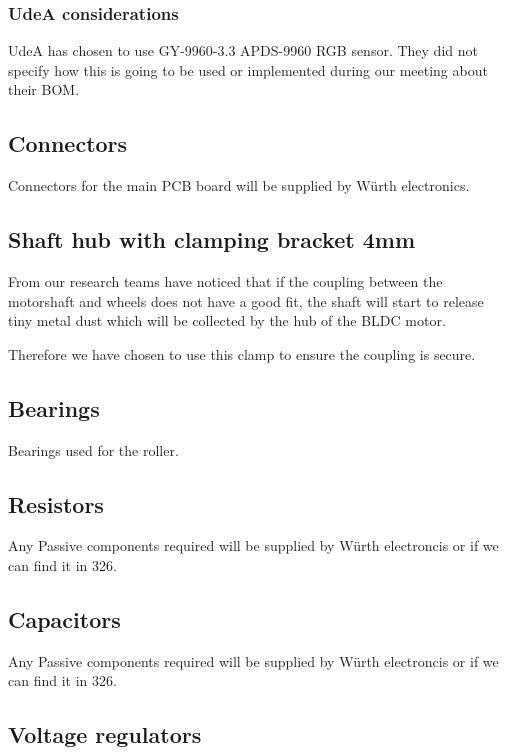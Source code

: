 \documentclass[a4paper,8pt]{article}
\begin{document}
  \subsubsection{UdeA considerations}

  UdeA has chosen to use GY-9960-3.3 APDS-9960 RGB sensor. They did not specify how this is going to be used or implemented during our meeting about their BOM.

  \subsection{Connectors}

  Connectors for the main PCB board will be supplied by Würth
  electronics.

  \subsection{Shaft hub with clamping bracket 4mm}

  From our research teams have noticed that if the coupling between the
  motorshaft and wheels does not have a good fit, the shaft will start
  to release tiny metal dust which will be collected by the hub of the
  BLDC motor.

  Therefore we have chosen to use this clamp to ensure the coupling is
  secure.

  \subsection{Bearings}

  Bearings used for the roller.

  \subsection{Resistors}

  Any Passive components required will be supplied by Würth electroncis
  or if we can find it in 326.

  \subsection{Capacitors}

  Any Passive components required will be supplied by Würth electroncis
  or if we can find it in 326.

  \subsection{Voltage regulators}
\end{document}
